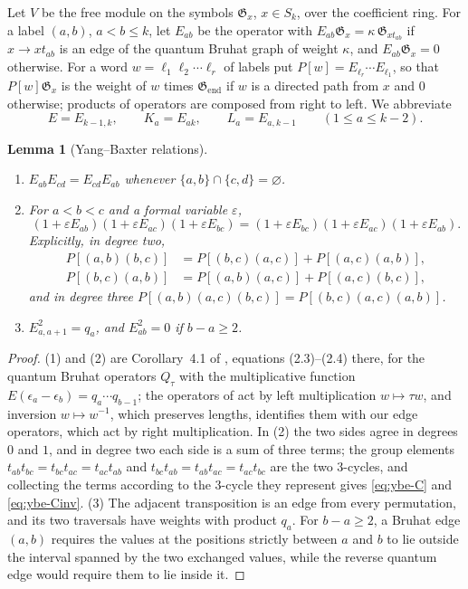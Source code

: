 \documentclass[11pt]{article}
\newtheorem{lemma}[proposition]{Lemma}
\newcommand{\G}{\mathfrak{G}}
\begin{document}
Let $V$ be the free module on the symbols $\G_x$, $x\in S_k$, over the
coefficient ring. For a label $(a,b)$, $a<b\leq k$, let $E_{ab}$ be
the operator with $E_{ab}\G_x=\kappa\,\G_{xt_{ab}}$ if $x\to xt_{ab}$
is an edge of the quantum Bruhat graph of weight $\kappa$, and
$E_{ab}\G_x=0$ otherwise. For a word $w=\ell_1\ell_2\cdots\ell_r$ of
labels put $P[w]=E_{\ell_r}\cdots E_{\ell_1}$, so that
$P[w]\G_x$ is the weight of $w$ times $\G_{\operatorname{end}}$ if $w$
is a directed path from $x$ and $0$ otherwise; products of operators
are composed from right to left. We abbreviate
\[
 E=E_{k-1,k},\qquad K_a=E_{ak},\qquad L_a=E_{a,k-1}\qquad(1\leq a\leq k-2).
\]

\begin{lemma}[Yang--Baxter relations]\label{lem:ybe}
\begin{enumerate}
\item $E_{ab}E_{cd}=E_{cd}E_{ab}$ whenever $\{a,b\}\cap\{c,d\}=\varnothing$.
\item For $a<b<c$ and a formal variable $\varepsilon$,
\[
 (1+\varepsilon E_{ab})(1+\varepsilon E_{ac})(1+\varepsilon E_{bc})
 =(1+\varepsilon E_{bc})(1+\varepsilon E_{ac})(1+\varepsilon E_{ab}).
\]
Explicitly, in degree two,
\begin{align}
 P[(a,b)(b,c)]&=P[(b,c)(a,c)]+P[(a,c)(a,b)],\label{eq:ybe-C}\\
 P[(b,c)(a,b)]&=P[(a,b)(a,c)]+P[(a,c)(b,c)],\label{eq:ybe-Cinv}
\end{align}
and in degree three $P[(a,b)(a,c)(b,c)]=P[(b,c)(a,c)(a,b)]$.
\item $E_{a,a+1}^2=q_a$, and $E_{ab}^2=0$ if $b-a\geq2$.
\end{enumerate}
\end{lemma}

\begin{proof}
(1) and (2) are Corollary~4.1 of \cite{brenti1999mixed}, equations
(2.3)--(2.4) there, for the quantum Bruhat operators $Q_\tau$ with the
multiplicative function $E(\epsilon_a-\epsilon_b)=q_a\cdots q_{b-1}$;
the operators of \cite{brenti1999mixed} act by left multiplication
$w\mapsto\tau w$, and inversion $w\mapsto w^{-1}$, which preserves
lengths, identifies them with our edge operators, which act by right
multiplication. In (2) the two sides agree in degrees $0$ and $1$, and
in degree two each side is a sum of three terms; the group elements
$t_{ab}t_{bc}=t_{bc}t_{ac}=t_{ac}t_{ab}$ and
$t_{bc}t_{ab}=t_{ab}t_{ac}=t_{ac}t_{bc}$ are the two $3$-cycles, and
collecting the terms according to the $3$-cycle they represent gives
\eqref{eq:ybe-C} and \eqref{eq:ybe-Cinv}. (3) The adjacent
transposition is an edge from every permutation, and its two
traversals have weights with product $q_a$. For $b-a\geq2$, a Bruhat
edge $(a,b)$ requires the values at the positions strictly between $a$
and $b$ to lie outside the interval spanned by the two exchanged
values, while the reverse quantum edge would require them to lie
inside it.
\end{proof}
\end{document}
